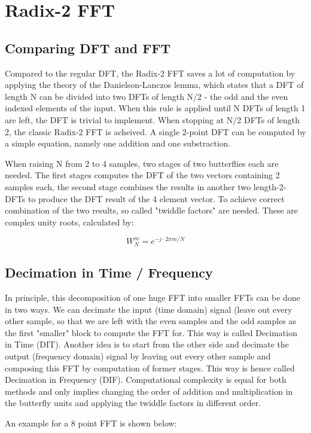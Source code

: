 \chapter{Radix-2 FFT}
\section{Comparing DFT and FFT}
Compared to the regular DFT, the Radix-2 FFT saves a lot of computation by applying the theory of the Danielson-Lanczos lemma, which states that a DFT of length N can be divided into two DFTs of length N/2 - the odd and the even indexed elements of the input. When this rule is applied until N DFTs of length 1 are left, the DFT is trivial to implement. When stopping at N/2 DFTs of length 2, the classic Radix-2 FFT is acheived. A single 2-point DFT can be computed by a simple equation, namely one addition and one substraction.

When raising N from 2 to 4 samples, two stages of two butterflies each are needed. The first stages computes the DFT of the two vectors containing 2 samples each, the second stage combines the results in another two length-2-DFTs to produce the DFT result of the 4 element vector. To achieve correct combination of the two results, so called "twiddle factors" are needed. These are complex unity roots, calculated by:

\begin{equation}
W_N^m = e^{-j \cdot 2 \pi m/N}
\end{equation}

\section{Decimation in Time / Frequency}
In principle, this decomposition of one huge FFT into smaller FFTs can be done in two ways. We can decimate the input (time domain) signal (leave out every other sample, so that we are left with the even samples and the odd samples as the first "smaller" block to compute the FFT for. This way is called Decimation in Time (DIT). Another idea is to start from the other side and decimate the output (frequency domain) signal by leaving out every other sample and composing this FFT by computation of former stages. This way is hence called Decimation in Frequency (DIF). Computational complexity is equal for both methods and only implies changing the order of addition and multiplication in the butterfly units and applying the twiddle factors in different order.

An example for a 8 point FFT is shown below:

